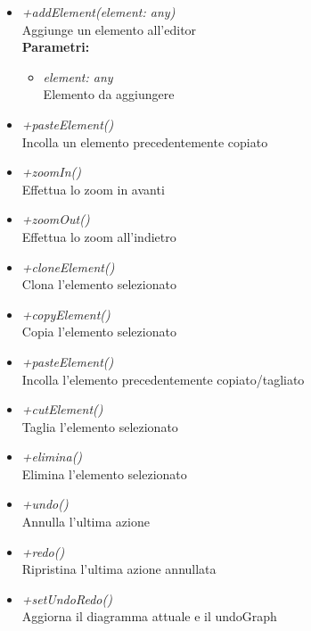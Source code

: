 \begin{itemize}
\begin{itemize}
    		\item \emph{+addElement(element: any)}\\
    		Aggiunge un elemento all'editor\\
    		\textbf{Parametri:}
    		\begin{itemize}
    			\item \emph{element: any}\\
    			Elemento da aggiungere
    		\end{itemize}
    		\item \emph{+pasteElement()}\\
    		Incolla un elemento precedentemente copiato
    		\item \emph{+zoomIn()}\\
    		Effettua lo zoom in avanti
    		\item \emph{+zoomOut()}\\
    		Effettua lo zoom all'indietro
    		\item \emph{+cloneElement()}\\
    		Clona l'elemento selezionato
    		\item \emph{+copyElement()}\\
    		Copia l'elemento selezionato
    		\item \emph{+pasteElement()}\\
    		Incolla l'elemento precedentemente copiato/tagliato
    		\item \emph{+cutElement()}\\
    		Taglia l'elemento selezionato
    		\item \emph{+elimina()}\\
    		Elimina l'elemento selezionato
    		\item \emph{+undo()}\\
    		Annulla l'ultima azione
    		\item \emph{+redo()}\\
    		Ripristina l'ultima azione annullata
    		\item \emph{+setUndoRedo()}\\
    		Aggiorna il diagramma attuale e il undoGraph
		\end{itemize}
\end{itemize}